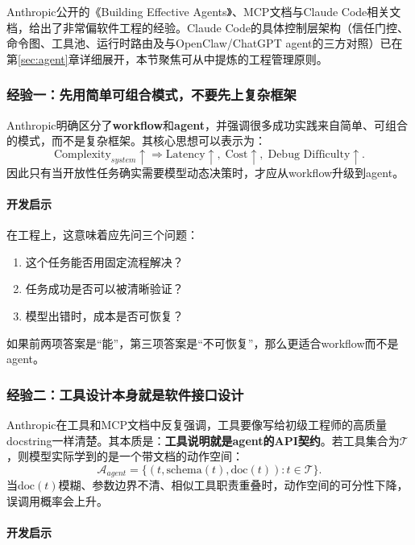 \documentclass[12pt,a4paper]{article}
\begin{document}
Anthropic公开的《Building Effective Agents》、MCP文档与Claude Code相关文档，给出了非常偏软件工程的经验。Claude Code的具体控制层架构（信任门控、命令图、工具池、运行时路由及与OpenClaw/ChatGPT agent的三方对照）已在第\ref{sec:agent}章详细展开，本节聚焦可从中提炼的工程管理原则。

\subsubsection{经验一：先用简单可组合模式，不要先上复杂框架}

Anthropic明确区分了\textbf{workflow}和\textbf{agent}，并强调很多成功实践来自简单、可组合的模式，而不是复杂框架。其核心思想可以表示为：
\begin{equation}
\text{Complexity}_{system} \uparrow \Rightarrow \text{Latency} \uparrow,\; \text{Cost} \uparrow,\; \text{Debug Difficulty} \uparrow.
\end{equation}
因此只有当开放性任务确实需要模型动态决策时，才应从workflow升级到agent。
\paragraph{开发启示}

在工程上，这意味着应先问三个问题：
\begin{enumerate}
    \item 这个任务能否用固定流程解决？
    \item 任务成功是否可以被清晰验证？
    \item 模型出错时，成本是否可恢复？
\end{enumerate}
如果前两项答案是“能”，第三项答案是“不可恢复”，那么更适合workflow而不是agent。

\subsubsection{经验二：工具设计本身就是软件接口设计}

Anthropic在工具和MCP文档中反复强调，工具要像写给初级工程师的高质量docstring一样清楚。其本质是：\textbf{工具说明就是agent的API契约}。若工具集合为$\mathcal{T}$，则模型实际学到的是一个带文档的动作空间：
\begin{equation}
\mathcal{A}_{agent} = \{(t, \text{schema}(t), \text{doc}(t)) : t \in \mathcal{T}\}.
\end{equation}
当$\text{doc}(t)$模糊、参数边界不清、相似工具职责重叠时，动作空间的可分性下降，误调用概率会上升。

\paragraph{开发启示}
\end{document}
